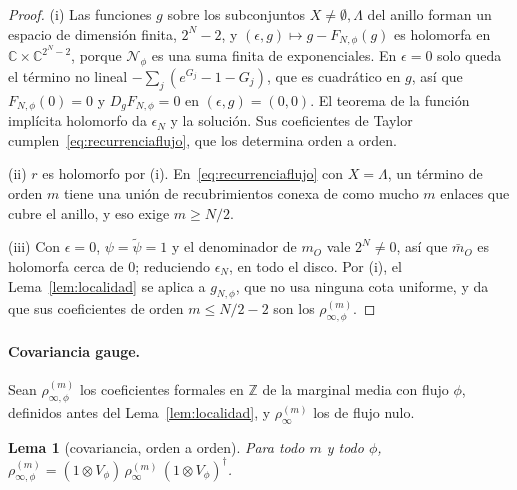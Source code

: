\documentclass[11pt,a4paper]{article}
\newtheorem{lema}[teorema]{Lema}
\theoremstyle{remark}
\begin{document}
\begin{proof}
(i) Las funciones $g$ sobre los subconjuntos $X\ne\emptyset,\Lambda$ del anillo forman un espacio de
dimensión finita, $2^N-2$, y $(\epsilon,g)\mapsto g-F_{N,\phi}(g)$ es holomorfa en $\mathbb C\times\mathbb C^{2^N-2}$,
porque $\mathcal N_\phi$ es una suma finita de exponenciales. En $\epsilon=0$ solo queda el término no lineal
$-\sum_j(e^{G_j}-1-G_j)$, que es cuadrático en $g$, así que $F_{N,\phi}(0)=0$ y $D_gF_{N,\phi}=0$ en
$(\epsilon,g)=(0,0)$. El teorema de la función implícita holomorfo da $\epsilon_N$ y la solución. Sus
coeficientes de Taylor cumplen~\eqref{eq:recurrenciaflujo}, que los determina orden a orden.

(ii) $r$ es holomorfo por (i). En~\eqref{eq:recurrenciaflujo} con $X=\Lambda$, un término de orden $m$
tiene una unión de recubrimientos conexa de como mucho $m$ enlaces que cubre el anillo, y eso exige
$m\ge N/2$.

(iii) Con $\epsilon=0$, $\psi=\tilde\psi=1$ y el denominador de $m_O$ vale $2^N\ne0$, así que $\bar m_O$ es
holomorfa cerca de $0$; reduciendo $\epsilon_N$, en todo el disco. Por (i), el Lema~\ref{lem:localidad}
se aplica a $g_{N,\phi}$, que no usa ninguna cota uniforme, y da que sus coeficientes de orden
$m\le N/2-2$ son los $\rho^{(m)}_{\infty,\phi}$.
\end{proof}

\paragraph{Covariancia gauge.} Sean $\rho^{(m)}_{\infty,\phi}$ los coeficientes formales en $\mathbb Z$ de
la marginal media con flujo $\phi$, definidos antes del Lema~\ref{lem:localidad}, y $\rho^{(m)}_\infty$ los de
flujo nulo.

\begin{lema}[covariancia, orden a orden]\label{lem:covariancia}
Para todo $m$ y todo $\phi$, $\rho^{(m)}_{\infty,\phi}=(1\otimes V_\phi)\,\rho^{(m)}_\infty\,(1\otimes V_\phi)^\dagger$.
\end{lema}
\end{document}
